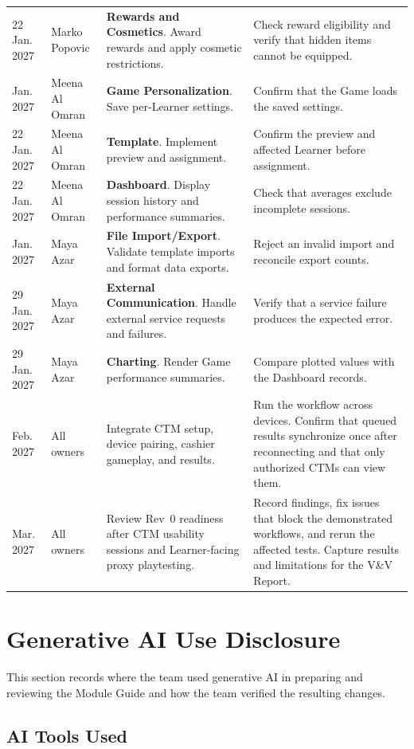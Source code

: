 \documentclass[12pt, titlepage]{article}
\begin{document}
\begin{longtable}{@{}p{}p{}p{}p{}@{}}
22 Jan. 2027 & Marko Popovic & \textbf{Rewards and Cosmetics}. Award rewards and apply cosmetic restrictions. & Check reward eligibility and verify that hidden items cannot be equipped. \\
\addlinespace
22 Jan. 2027 & Meena Al Omran & \textbf{Game Personalization}. Save per-Learner settings. & Confirm that the Game loads the saved settings. \\
22 Jan. 2027 & Meena Al Omran & \textbf{Template}. Implement preview and assignment. & Confirm the preview and affected Learner before assignment. \\
22 Jan. 2027 & Meena Al Omran & \textbf{Dashboard}. Display session history and performance summaries. & Check that averages exclude incomplete sessions. \\
\addlinespace
29 Jan. 2027 & Maya Azar & \textbf{File Import/Export}. Validate template imports and format data exports. & Reject an invalid import and reconcile export counts. \\
29 Jan. 2027 & Maya Azar & \textbf{External Communication}. Handle external service requests and failures. & Verify that a service failure produces the expected error. \\
29 Jan. 2027 & Maya Azar & \textbf{Charting}. Render Game performance summaries. & Compare plotted values with the Dashboard records. \\
\addlinespace
12 Feb. 2027 & All owners &
Integrate CTM setup, device pairing, cashier gameplay, and results. &
Run the workflow across devices. Confirm that queued results synchronize
once after reconnecting and that only authorized CTMs can view them. \\
\addlinespace
5 Mar. 2027 & All owners &
Review Rev~0 readiness after CTM usability sessions and Learner-facing
proxy playtesting. &
Record findings, fix issues that block the demonstrated workflows, and
rerun the affected tests. Capture results and limitations for the V\&V Report. \\
\end{longtable}

\section{Generative AI Use Disclosure}

This section records where the team used generative AI in preparing and
reviewing the Module Guide and how the team verified the resulting changes.

\subsection{AI Tools Used}
\end{document}
